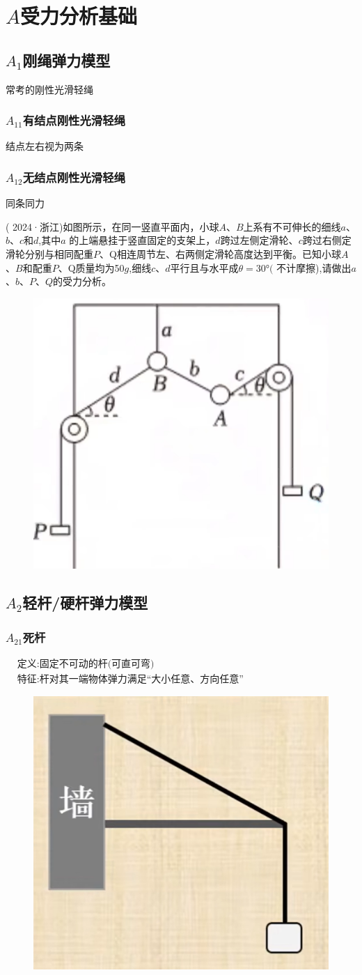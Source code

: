 \documentclass[lang=cn,10pt]{elegantbook}
\begin{document}
	\section{$A$受力分析基础}
	\subsection{$A_{1}$刚绳弹力模型}
	常考的刚性光滑轻绳
	\subsubsection{$A_{11}$有结点刚性光滑轻绳}
	结点左右视为两条
	\subsubsection{$A_{12}$无结点刚性光滑轻绳}
	同条同力
	\begin{example}
		( 2024·浙江)如图所示，在同一竖直平面内，小球$A$、$B$上系有不可伸长的细线$a$、$b$、$c$和$d$,其中$a$ 的上端悬挂于竖直固定的支架上，$d$跨过左侧定滑轮、$c$跨过右侧定滑轮分别与相同配重$P$、Q相连周节左、右两侧定滑轮高度达到平衡。已知小球$A$、$B$和配重$P$、Q质量均为50$g$,细线$c$、$d$平行且与水平成$\theta=30°($ 不计摩擦),请做出$a$、$b$、$P$、$Q$的受力分析。
		\begin{figure}[H]
			\centering
			\includegraphics[width=0.4\linewidth]{image/11}
		\end{figure}
	\end{example}
	\subsection{$A_{2}$轻杆/硬杆弹力模型}
	\subsubsection{$A_{21}$死杆}
	$\begin{aligned}&\text{定义:固定不可动的杆(可直可弯)}\\&\text{特征:杆对其一端物体弹力满足“大小任意、方向任意”}\end{aligned}$
	\begin{figure}[H]
		\centering
		\includegraphics[width=0.2\linewidth]{image/15}
	\end{figure}
	
\end{document}
